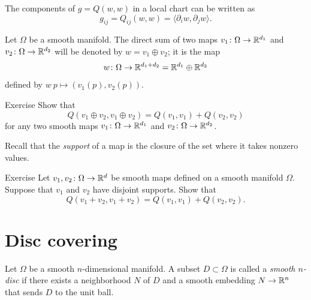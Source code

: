 The components of $g = Q(w, w)$ in a local chart can be written as
\[
g_{ij} = Q_{ij}(w, w) = \langle \partial_i w, \partial_j w \rangle.
\]

Let $\Omega$ be a smooth manifold.
The direct sum of two maps $v_1\:\Omega\z\to\RR^{d_1}$ and $v_2\:\Omega\z\to\RR^{d_2}$ will be denoted by $w=v_1\oplus v_2$;
it is the map
\[w\colon\Omega\to\mathbb{R}^{d_1+d_2}=\mathbb{R}^{d_1}\oplus\mathbb{R}^{d_2}\]
defined by
$w\:p\mapsto (v_1(p),v_2(p))$.

\begin{thm}{Exercise}\label{ex:oplus}
Show that
\[Q(v_1\oplus v_2,v_1\oplus v_2)=Q(v_1,v_1)+Q(v_2,v_2)\]
for any two smooth maps $v_1\colon\Omega\to \mathbb{R}^{d_1}$ and $v_2\colon\Omega\to \mathbb{R}^{d_2}$.
\end{thm}

Recall that the \emph{support} of a map is the closure of the set where it takes nonzero values.

\begin{thm}{Exercise}\label{ex:plus-oplus}
Let $v_1, v_2\colon\Omega \to \mathbb{R}^d$ be smooth maps defined on a smooth manifold $\Omega$.
Suppose that $v_1$ and $v_2$ have disjoint supports.
Show that
\[Q(v_1+ v_2,v_1+ v_2)=Q(v_1,v_1)+Q(v_2,v_2).\]
\end{thm}

\section{Disc covering}

Let $\Omega$ be a smooth $n$-dimensional manifold.
A subset $D \subset \Omega$ is called a \emph{smooth $n$-disc} if there exists a neighborhood $N$ of $D$ and a smooth embedding $N \to \mathbb{R}^n$ that sends $D$ to the unit ball.

